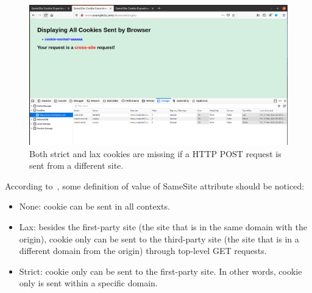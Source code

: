 \begin{figure}
    \centering
    \includegraphics[height=\textheight,width=\textwidth,keepaspectratio]
    {figures/samesite_cookie_post_crosssite.png}
    \caption{Both strict and lax cookies are missing if a HTTP POST request
    is sent from a different site.}
    \label{fig:crosssite_cookie_post}
\end{figure}

According to~\cite{samesite_cookie}, some definition of value
of {\selectfont SameSite} attribute should be noticed:

\begin{itemize}
    \item None: cookie can be sent in all contexts.
    \item Lax: besides the first-party site (the site that is in the same domain
    with the origin), cookie only can be sent to the third-party site (the site that
    is in a different domain from the origin) through top-level GET requests.
    \item Strict: cookie only can be sent to the first-party site. In other words,
    cookie only is sent within a specific domain.
\end{itemize}

